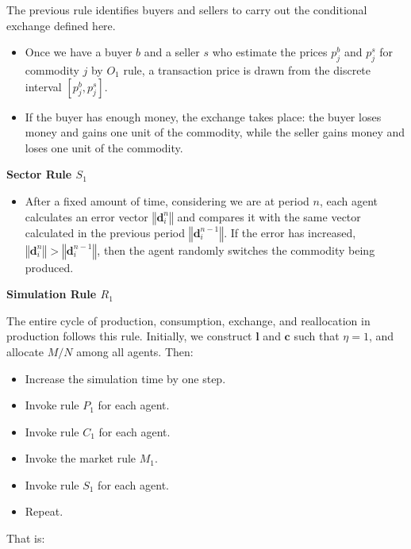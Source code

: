 The previous rule identifies buyers and sellers to carry out the conditional exchange defined here.

\begin{itemize}
    \item  Once we have a buyer $b$ and a seller $s$ who estimate the prices $p_{j}^{b}$ and $p_{j}^{s}$ for commodity $j$ by $O_1$ rule,    a transaction price is drawn from the discrete interval $\left[p_{j}^{b},p_{j}^{s}\right]$.  

\item If the buyer has enough money, the exchange takes place:  
  the buyer loses money and gains one unit of the commodity, while the seller gains money and loses one unit of the commodity.
\end{itemize}


\textbf{Sector Rule $S_{1}$}

\begin{itemize}
    \item After a fixed amount of time, considering we are at period $n$, each agent calculates an error vector  $\left\Vert \boldsymbol{d}_{i}^{n}\right\Vert$ and compares it with the same vector calculated in the previous period $\left\Vert \boldsymbol{d}_{i}^{n-1}\right\Vert$.  If the error has increased, $\left\Vert \boldsymbol{d}_{i}^{n}\right\Vert > \left\Vert \boldsymbol{d}_{i}^{n-1}\right\Vert$,  then the agent randomly switches the commodity being produced.


\end{itemize}


 \textbf{Simulation Rule $R_{1}$}

The entire cycle of production, consumption, exchange, and reallocation in production follows this rule.  Initially, we construct $\boldsymbol{l}$ and $\boldsymbol{c}$ such that $\eta=1$, and allocate $M/N$ among all agents. Then:

\begin{itemize}
    \item Increase the simulation time by one step.  
\item Invoke rule $P_{1}$ for each agent.  
\item Invoke rule $C_{1}$ for each agent.  
\item Invoke the market rule $M_{1}$.  
\item Invoke rule $S_{1}$ for each agent.  
\item Repeat.  
\end{itemize}


That is:

